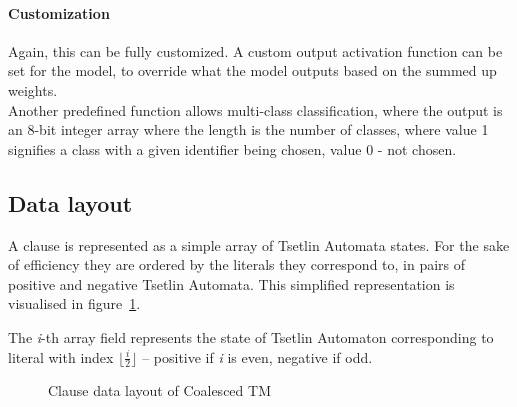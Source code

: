 \documentclass[english]{aghengthesis} %
\begin{document}
\paragraph{Customization}
Again, this can be fully customized. A custom output activation function can be set for the model, to override what the model outputs based on the summed up weights. \\
Another predefined function allows multi-class classification, where the output is an 8-bit integer array where the length is the number of classes, where value 1 signifies a class with a given identifier being chosen, value 0 - not chosen.

\subsection{Data layout}
A clause is represented as a simple array of Tsetlin Automata states. For the sake of efficiency they are ordered by the literals they correspond to, in pairs of positive and negative Tsetlin Automata. This simplified representation is visualised in figure~\ref{fig:dense-data-layout}.
\par The \textit{i}-th array field represents the state of Tsetlin Automaton corresponding to literal with index $\lfloor \frac{i}{2} \rfloor$ -- positive if \textit{i} is even, negative if odd.

\begin{figure}[!htbp]
\centering
{}
\caption{Clause data layout of Coalesced TM}
\label{fig:dense-data-layout}
\end{figure}
\end{document}
